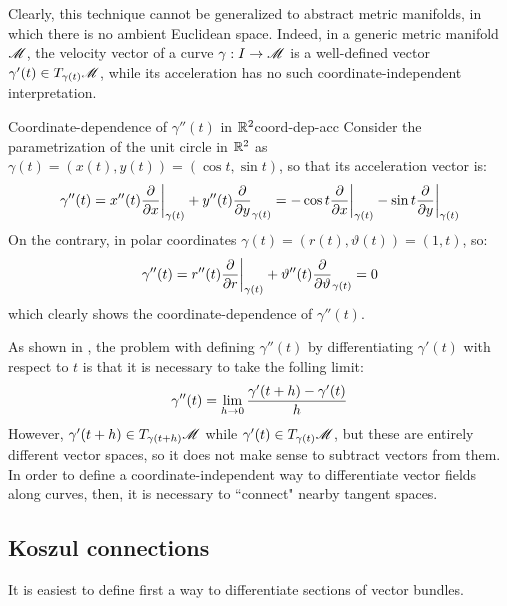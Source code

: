 Clearly, this technique cannot be generalized to abstract metric manifolds, in which there is no ambient Euclidean space. Indeed, in a generic metric manifold $ \mathscr{M} $, the velocity vector of a curve $ \gamma : I \rightarrow \mathscr{M} $ is a well-defined vector $ \gamma'(t) \in T_{\gamma(t)}\mathscr{M} $, while its acceleration has no such coordinate-independent interpretation.

\begin{example}{Coordinate-dependence of $ \gamma''(t) $ in $ \mathbb{R}^2 $}{coord-dep-acc}
  Consider the parametrization of the unit circle in $ \mathbb{R}^2 $ as $ \gamma(t) = (x(t) , y(t)) = (\cos t , \sin t) $, so that its acceleration vector is:
  \begin{equation*}
    \gamma''(t) = x''(t) \frac{\partial}{\partial x} \bigg\vert_{\gamma(t)} + y''(t) \frac{\partial}{\partial y}_{\gamma(t)} = - \cos t \frac{\partial}{\partial x} \bigg\vert_{\gamma(t)} - \sin t \frac{\partial}{\partial y} \bigg\vert_{\gamma(t)}
  \end{equation*}
  On the contrary, in polar coordinates $ \gamma(t) = (r(t) , \vartheta(t)) = (1 , t) $, so:
  \begin{equation*}
    \gamma''(t) = r''(t) \frac{\partial}{\partial r} \bigg\vert_{\gamma(t)} + \vartheta''(t) \frac{\partial}{\partial \vartheta}_{\gamma(t)} = 0
  \end{equation*}
  which clearly shows the coordinate-dependence of $ \gamma''(t) $.
\end{example}

As shown in , the problem with defining $ \gamma''(t) $ by differentiating $ \gamma'(t) $ with respect to $ t $ is that it is necessary to take the folling limit:
\begin{equation*}
  \gamma''(t) = \lim_{h \rightarrow 0} \frac{\gamma'(t + h) - \gamma'(t)}{h}
\end{equation*}
However, $ \gamma'(t + h) \in T_{\gamma(t + h)}\mathscr{M} $ while $ \gamma'(t) \in T_{\gamma(t)}\mathscr{M} $, but these are entirely different vector spaces, so it does not make sense to subtract vectors from them. In order to define a coordinate-independent way to differentiate vector fields along curves, then, it is necessary to ``connect" nearby tangent spaces.

\subsection{Koszul connections}

It is easiest to define first a way to differentiate sections of vector bundles.

